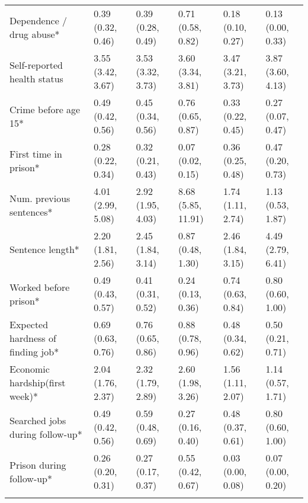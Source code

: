 \begin{scriptsize}
{\begin{longtable}{llllll}
  \quad Dependence / drug abuse* & 0.39 (0.32, 0.46) & 0.39 (0.28, 0.49) & 0.71 (0.58, 0.82) & 0.18 (0.10, 0.27) & 0.13 (0.00, 0.33) \\ 
  \quad Self-reported health status & 3.55 (3.42, 3.67) & 3.53 (3.32, 3.73) & 3.60 (3.34, 3.81) & 3.47 (3.21, 3.73) & 3.87 (3.60, 4.13) \\ 
  \quad Crime before age 15* & 0.49 (0.42, 0.56) & 0.45 (0.34, 0.56) & 0.76 (0.65, 0.87) & 0.33 (0.22, 0.45) & 0.27 (0.07, 0.47) \\ 
  \quad First time in prison* & 0.28 (0.22, 0.34) & 0.32 (0.21, 0.43) & 0.07 (0.02, 0.15) & 0.36 (0.25, 0.48) & 0.47 (0.20, 0.73) \\ 
  \quad Num. previous sentences* & 4.01 (2.99, 5.08) & 2.92 (1.95, 4.03) & 8.68 (5.85, 11.91) & 1.74 (1.11, 2.74) & 1.13 (0.53, 1.87) \\ 
  \quad Sentence length* & 2.20 (1.81, 2.56) & 2.45 (1.84, 3.14) & 0.87 (0.48, 1.30) & 2.46 (1.84, 3.15) & 4.49 (2.79, 6.41) \\ 
  \quad Worked before prison* & 0.49 (0.43, 0.57) & 0.41 (0.31, 0.52) & 0.24 (0.13, 0.36) & 0.74 (0.63, 0.84) & 0.80 (0.60, 1.00) \\ 
  \quad Expected hardness of finding job* & 0.69 (0.63, 0.76) & 0.76 (0.65, 0.86) & 0.88 (0.78, 0.96) & 0.48 (0.34, 0.62) & 0.50 (0.21, 0.71) \\ 
  \quad Economic hardship(first week)* & 2.04 (1.76, 2.37) & 2.32 (1.79, 2.89) & 2.60 (1.98, 3.26) & 1.56 (1.11, 2.07) & 1.14 (0.57, 1.71) \\ 
  \quad Searched jobs during follow-up* & 0.49 (0.42, 0.56) & 0.59 (0.48, 0.69) & 0.27 (0.16, 0.40) & 0.48 (0.37, 0.61) & 0.80 (0.60, 1.00) \\ 
  \quad Prison during follow-up* & 0.26 (0.20, 0.31) & 0.27 (0.17, 0.37) & 0.55 (0.42, 0.67) & 0.03 (0.00, 0.08) & 0.07 (0.00, 0.20) \\ 
  \addlinespace
\addlinespace
\addlinespace
\hline
\addlinespace
\multicolumn{6}{l}{* Statistically significant differences across clusters (p-value $<$ 0.05). 95\% bootstrapped confidence intervals in parenthesis (1000 samples).} \\
\end{longtable}
}
\end{scriptsize}
